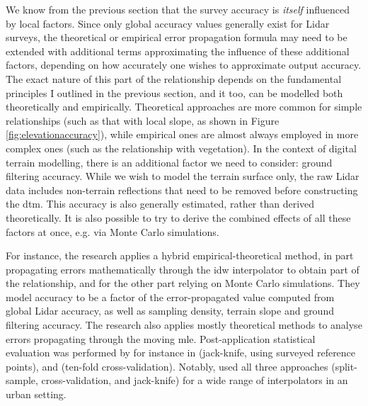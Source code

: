 We know from the previous section that the survey accuracy is \textit{itself} influenced by local factors. Since only global accuracy values generally exist for Lidar surveys, the theoretical or empirical error propagation formula may need to be extended with additional terms approximating the influence of these additional factors, depending on how accurately one wishes to approximate output accuracy. The exact nature of this part of the relationship depends on the fundamental principles I outlined in the previous section, and it too, can be modelled both theoretically and empirically. Theoretical approaches are more common for simple relationships (such as that with local slope, as shown in Figure \ref{fig:elevationaccuracy}), while empirical ones are almost always employed in more complex ones (such as the relationship with vegetation). In the context of digital terrain modelling, there is an additional factor we need to consider: ground filtering accuracy. While we wish to model the terrain surface only, the raw Lidar data includes non-terrain reflections that need to be removed before constructing the \ac{dtm}. This accuracy is also generally estimated, rather than derived theoretically. It is also possible to try to derive the combined effects of all these factors at once, e.g. via Monte Carlo simulations.

For instance, the research \cite{aguilar_etal_2010} applies a hybrid empirical-theoretical method, in part propagating errors mathematically through the \ac{idw} interpolator to obtain part of the relationship, and for the other part relying on Monte Carlo simulations. They model accuracy to be a factor of the error-propagated value computed from global Lidar accuracy, as well as sampling density, terrain slope and ground filtering accuracy. The research \cite{kraus_etal_2006} also applies mostly theoretical methods to analyse errors propagating through the moving \ac{mle}. Post-application statistical evaluation was performed by for instance in \cite{peng_shih_2006} (jack-knife, using surveyed reference points), and \cite{guo_etal_2010} (ten-fold cross-validation). Notably, \cite{smith_etal_2005} used all three approaches (split-sample, cross-validation, and jack-knife) for a wide range of interpolators in an urban setting.


